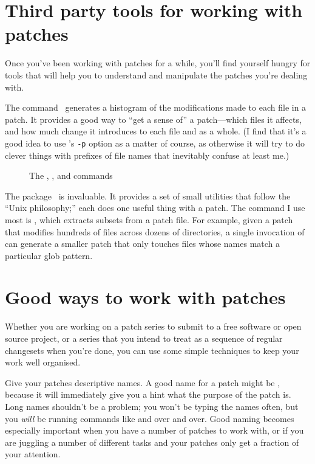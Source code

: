 \section{Third party tools for working with patches}
\label{sec:mq:tools}

Once you've been working with patches for a while, you'll find
yourself hungry for tools that will help you to understand and
manipulate the patches you're dealing with.

The  command~\cite{web:diffstat} generates a
histogram of the modifications made to each file in a patch.  It
provides a good way to ``get a sense of'' a patch---which files it
affects, and how much change it introduces to each file and as a
whole.  (I find that it's a good idea to use 's
\texttt{-p} option as a matter of course, as otherwise it will try to
do clever things with prefixes of file names that inevitably confuse
at least me.)

\begin{figure}[ht]
  \caption{The , , and  commands}
  \label{ex:mq:tools}
\end{figure}

The  package~\cite{web:patchutils} is invaluable.
It provides a set of small utilities that follow the ``Unix
philosophy;'' each does one useful thing with a patch.  The
 command I use most is , which
extracts subsets from a patch file.  For example, given a patch that
modifies hundreds of files across dozens of directories, a single
invocation of  can generate a smaller patch that
only touches files whose names match a particular glob pattern.

\section{Good ways to work with patches}

Whether you are working on a patch series to submit to a free software
or open source project, or a series that you intend to treat as a
sequence of regular changesets when you're done, you can use some
simple techniques to keep your work well organised.

Give your patches descriptive names.  A good name for a patch might be
, because it will immediately give
you a hint what the purpose of the patch is.  Long names shouldn't be
a problem; you won't be typing the names often, but you \emph{will} be
running commands like  and  over and over.
Good naming becomes especially important when you have a number of
patches to work with, or if you are juggling a number of different
tasks and your patches only get a fraction of your attention.

